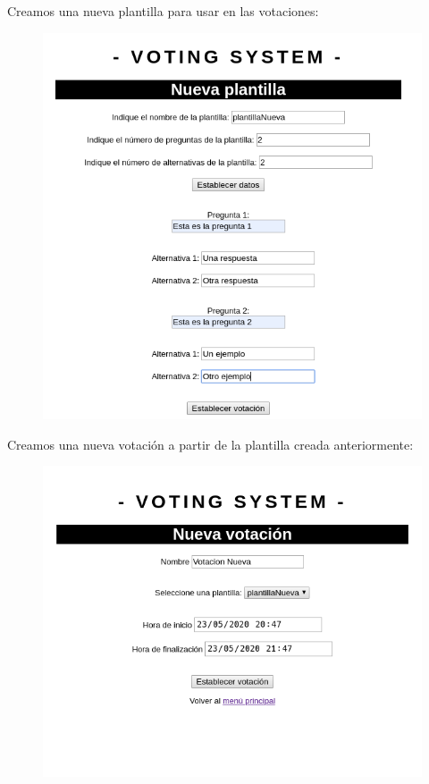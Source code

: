 \documentclass{article}
\begin{document}
 	Creamos una nueva plantilla para usar en las votaciones:
 	\begin{figure}[H]
 		\centering
 		\includegraphics[totalheight=9cm]{img/cap9}
 		\caption{}
 	\end{figure}
 
 	Creamos una nueva votación a partir de la plantilla creada anteriormente:
 	\begin{figure}[H]
 		\centering
 		\includegraphics[totalheight=7.5cm]{img/cap10}
 		\caption{}
 	\end{figure}
 
\end{document}
